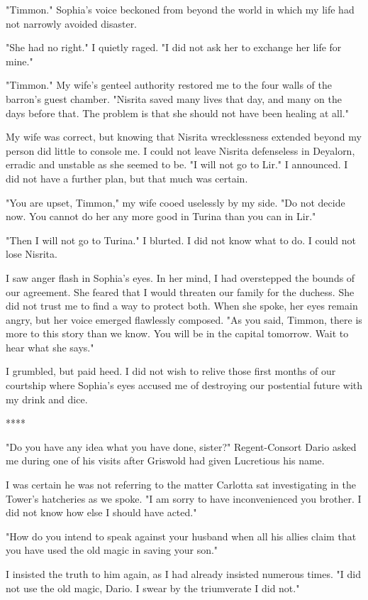 \documentclass{article}
\begin{document}
"Timmon."  Sophia's voice beckoned from beyond the world in which my life had not narrowly avoided disaster.

"She had no right." I quietly raged. "I did not ask her to exchange her life for mine."

"Timmon." My wife's genteel authority restored me to the four walls of the barron's guest chamber. "Nisrita saved many lives that day, and many on the days before that. The problem is that she should not have been healing at all."

My wife was correct, but knowing that Nisrita wrecklessness extended beyond my person did little to console me. I could not leave Nisrita defenseless in Deyalorn, erradic and unstable as she seemed to be. "I will not go to Lir." I announced. I did not have a further plan, but that much was certain.

"You are upset, Timmon," my wife cooed uselessly by my side. "Do not decide now. You cannot do her any more good in Turina than you can in Lir."

"Then I will not go to Turina." I blurted. I did not know what to do. I could not lose Nisrita.

I saw anger flash in Sophia's eyes. In her mind, I had overstepped the bounds of our agreement. She feared that I would threaten our family for the duchess. She did not trust me to find a way to protect both. When she spoke, her eyes remain angry, but her voice emerged flawlessly composed. "As you said, Timmon, there is more to this story than we know. You will be in the capital tomorrow. Wait to hear what she says." 

I grumbled, but paid heed. I did not wish to relive those first months of our courtship where Sophia's eyes accused me of destroying our postential future with my drink and dice.
 
****

"Do you have any idea what you have done, sister?" Regent-Consort Dario asked me during one of his visits after Griswold had given Lucretious his name. 

I was certain he was not referring to the matter Carlotta sat investigating in the Tower's hatcheries as we spoke. "I am sorry to have inconvenienced you brother. I did not know how else I should have acted."

"How do you intend to speak against your husband when all his allies claim that you have used the old magic in saving your son."

I insisted the truth to him again, as I had already insisted numerous times. "I did not use the old magic, Dario. I swear by the triumverate I did not."
\end{document}
